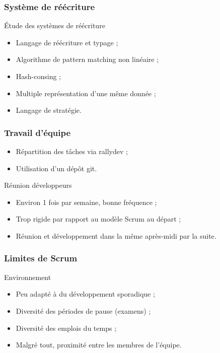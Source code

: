 \begin{frame}
\frametitle{Système de réécriture}

\begin{block}{Étude des systèmes de réécriture}
\begin{itemize}
\item Langage de réécriture et typage ;
\item Algorithme de pattern matching non linéaire ;
\item Hash-consing ;
\item Multiple représentation d'une même donnée ;
\item Langage de stratégie.
\end{itemize}
\end{block}

\end{frame}

\begin{frame}
\frametitle{Travail d'équipe}

\begin{itemize}
\item Répartition des tâches via rallydev ;
\item Utilisation d'un dépôt git.
\end{itemize}

\begin{block}{Réunion développeurs}
\begin{itemize}
\item Environ 1 fois par semaine, bonne fréquence ;
\item Trop rigide par rapport au modèle Scrum au départ ;
\item Réunion et développement dans la même après-midi par la suite.
\end{itemize}
\end{block}
\end{frame}

\begin{frame}
\frametitle{Limites de Scrum}

\begin{block}{Environnement}
\begin{itemize}
\item Peu adapté à du développement sporadique ;
\item Diversité des périodes de pause (examens) ;
\item Diversité des emplois du temps ;
\item Malgré tout, proximité entre les membres de l'équipe.
\end{itemize}
\end{block}
\pause

\end{frame}

